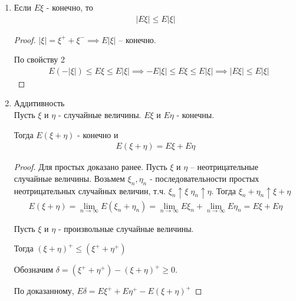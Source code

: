 \begin{enumerate}[label=\protect\circled{\arabic*},series=mean_properties]
\begin{proof}
      Пусть $\xi$ и $\eta$ - произвольные.

      Тогда $\xi^+(\omega) \geq \eta^+(\omega)$ и $\xi^-(\omega) \leq \eta^-(\omega)$

      $\implies E \eta = E \eta^+ - E \eta^- \leq E \xi^+ - E \xi^- = E \xi$
    \end{proof}

  \item 
    Если $E \xi$ - конечно, то
    \begin{align*}
      |E \xi| \leq E |\xi|
    \end{align*}

    \begin{proof}
      $|\xi| = \xi^+ + \xi^- \implies E|\xi|$ -- конечно.

      По свойству 2
      \begin{align*}
        &E(-|\xi|) \leq E \xi \leq E |\xi|
        \implies -E|\xi| \leq E\xi \leq E|\xi| \implies |E\xi| \leq E|\xi|
      \end{align*}
    \end{proof}

  \item 
    Аддитивность\\
    Пусть $\xi$ и $\eta$ - случайные величины. $E \xi$ и $E \eta$ - конечны.

    Тогда $E (\xi + \eta)$ - конечно и
    \begin{align*}
      E (\xi + \eta) = E \xi + E \eta
    \end{align*}

    \begin{proof}
      Для простых доказано ранее. Пусть $\xi$ и $\eta$ -- неотрицательные случайные величины.
      Возьмем $\xi_n, \eta_n$ - последовательности простых неотрицательных случайных величин, 
      т.ч. $\xi_n \uparrow \xi\;\eta_n \uparrow \eta$. Тогда $\xi_n + \eta_n \uparrow \xi + \eta$
      \begin{align*}
        E (\xi + \eta) = \lim_{n \to \infty} E(\xi_n + \eta_n) = 
        \lim_{n \to \infty} E \xi_n + \lim_{n \to \infty} E \eta_n = E \xi + E \eta
      \end{align*}
     
      Пусть $\xi$ и $\eta$ - произвольные случайные величины.

      Тогда $(\xi + \eta)^+ \leq (\xi^+ + \eta^+)$

      Обозначим $\delta = (\xi^+ + \eta^+) - (\xi + \eta)^+ \geq 0$.

	  По доказанному, $E\delta = E\xi^+ + E\eta^+ - E(\xi + \eta)^+$


\end{proof}
\end{enumerate}
